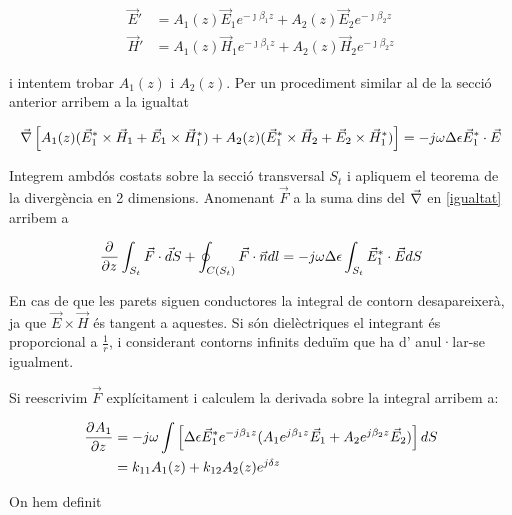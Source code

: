 \begin{subequations}
  \begin{align}
    \vec E ' &= A_1(z) \vec E_1 e^{-\jmath \beta_1 z} + A_2 (z) \vec E_2 e^{-\jmath \beta _2 z } \\
    \vec H ' &= A_1 (z) \vec H_1 e^{-\jmath \beta _1 z} + A_2 (z) \vec H_2 e^{-\jmath \beta_2 z}
  \end{align}
\end{subequations}

i intentem trobar $A_1(z)$ i $A_2(z)$. Per un procediment similar al de la secció anterior arribem a la igualtat

\begin{equation}
  \vec \nabla \left [ A_1(z) (\vec E_1^* \times \vec H_1 + \vec E_1 \times \vec H_1 ^ * ) + A_2 (z) (\vec E_1 ^* \times \vec H_2 +  \vec E_2 \times \vec H_1 ^* ) \right ] = - j \omega \Delta \epsilon  \vec E_1 ^* \cdot \vec E \label{igualtat}
\end{equation}

Integrem ambdós costats sobre la secció transversal $S_t$ i apliquem el teorema de la divergència en 2 dimensions. Anomenant $\vec F$ a la suma dins del $\vec \nabla$ en \cref{igualtat} arribem a

\begin{equation}
  \frac{\partial ^{} }{\partial z ^{}} \int_{S_t} \vec F \cdot \vec dS + \oint _{C(S_t)} \vec F \cdot \vec n dl = - j \omega \Delta \epsilon \int _{S_t} \vec E_1 ^* \cdot \vec E dS
\end{equation}

En cas de que les parets siguen conductores la integral de contorn desapareixerà, ja que $\vec E \times \vec H$ és tangent a aquestes. Si són dielèctriques el integrant és proporcional a $\frac{1}{r}$, i considerant contorns infinits deduïm que ha d' anul·lar-se igualment.

Si reescrivim $\vec F$ explícitament i calculem la derivada sobre la integral arribem a:

\begin{equation}
  \begin{aligned}
  \frac{\partial ^{} A_1}{\partial z ^{}} &= -j \omega \int \left[ \Delta \epsilon \vec E_1 ^* e^{-j \beta _1 z} ( A_1 e^{j \beta _1 z} \vec E_1 + A_2 e^{j \beta _2 z} \vec E_2) \right] dS \\
  &= k_{11} A_1 (z) + k_{12} A_2(z) e^{j \delta z}
  \end{aligned}
\end{equation}

On hem definit 

